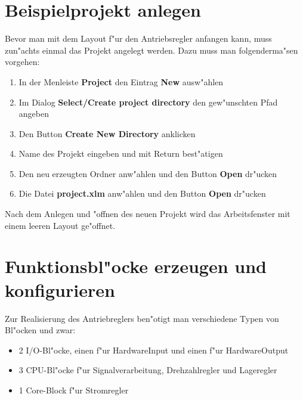\section {Beispielprojekt  anlegen}
Bevor man mit dem Layout f"ur den Antriebsregler anfangen kann, muss zun"achts einmal das Projekt angelegt werden. Dazu muss man folgenderma"sen vorgehen:
\begin{enumerate}
	\item In der Menleiste {\bf Project} den Eintrag {\bf New} ausw"ahlen
	\item Im Dialog {\bf Select/Create project directory} den gew"unschten Pfad angeben
	\item Den Button {\bf Create New Directory} anklicken
	\item Name des Projekt eingeben und mit Return best"atigen
	\item Den neu erzeugten Ordner anw"ahlen und den Button {\bf Open} dr"ucken
	\item Die Datei {\bf project.xlm} anw"ahlen und den Button {\bf Open} dr"ucken
\end{enumerate}
Nach dem Anlegen und "offnen des neuen Projekt wird das Arbeitsfenster mit einem leeren Layout ge"offnet.
\section{Funktionsbl"ocke erzeugen und konfigurieren}
Zur Realisierung des Antriebreglers ben"otigt man verschiedene Typen von Bl"ocken und zwar:
\begin{itemize}
	\item 2 I/O-Bl"ocke, einen f"ur HardwareInput und einen f"ur HardwareOutput
	\item 3 CPU-Bl"ocke f"ur Signalverarbeitung, Drehzahlregler und Lageregler
	\item 1 Core-Block f"ur Stromregler
\end{itemize}
